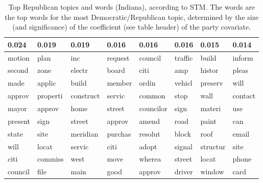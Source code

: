 \begin{table}[ht]
\centering
\begin{tabular}{llllllll}
  \hline
0.024 & 0.019 & 0.019 & 0.016 & 0.016 & 0.016 & 0.015 & 0.014 \\ 
  \hline
motion & plan & inc & request & council & traffic & build & inform \\ 
  second & zone & electr & board & citi & amp & histor & pleas \\ 
  made & applic & build & member & ordin & vehicl & preserv & will \\ 
  approv & properti & construct & servic & common & stop & wall & contact \\ 
  mayor & approv & home & street & councilor & sign & materi & use \\ 
  present & sign & street & approv & amend & road & paint & can \\ 
  state & site & meridian & purchas & resolut & block & roof & email \\ 
  will & locat & servic & citi & adopt & signal & structur & site \\ 
  citi & commiss & west & move & wherea & street & locat & phone \\ 
  council & file & main & good & approv & driver & window & card \\ 
   \hline
\end{tabular}
\caption{Top Republican topics and words (Indiana), according to STM. 
The words are the top words for the most Democratic/Republican topic, determined
by the size (and significance) of the coefficient (see table header) of the party covariate.} 
\label{tabSTMINRep}
\end{table}

